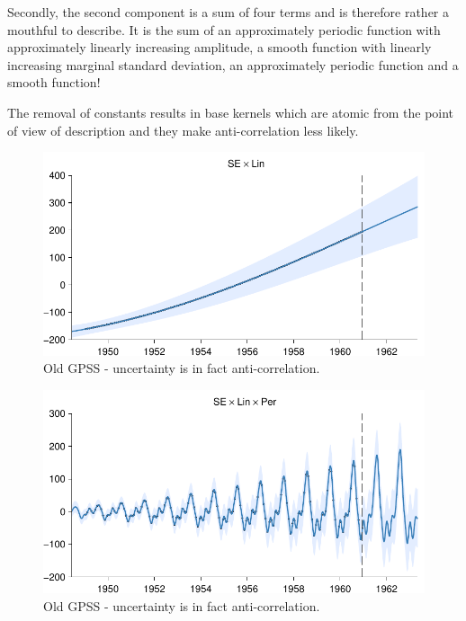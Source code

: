 \documentclass{article}
\begin{document}
Secondly, the second component is a sum of four terms and is therefore rather a mouthful to describe.
It is the sum of an approximately periodic function with approximately linearly increasing amplitude, a smooth function with linearly increasing marginal standard deviation, an approximately periodic function and a smooth function!

The removal of constants results in base kernels which are atomic from the point of view of description  and they make anti-correlation less likely.

\begin{figure}[h]
\centering
\includegraphics[width=0.98\columnwidth]{figures/old-gpss/01-airline-months_1}
\caption{Old GPSS - uncertainty is in fact anti-correlation.}
\label{fig:anti_corr_1}
\end{figure}

\begin{figure}[h]
\centering
\includegraphics[width=0.98\columnwidth]{figures/old-gpss/01-airline-months_2}
\caption{Old GPSS - uncertainty is in fact anti-correlation.}
\label{fig:anti_corr_2}
\end{figure}
\end{document}
